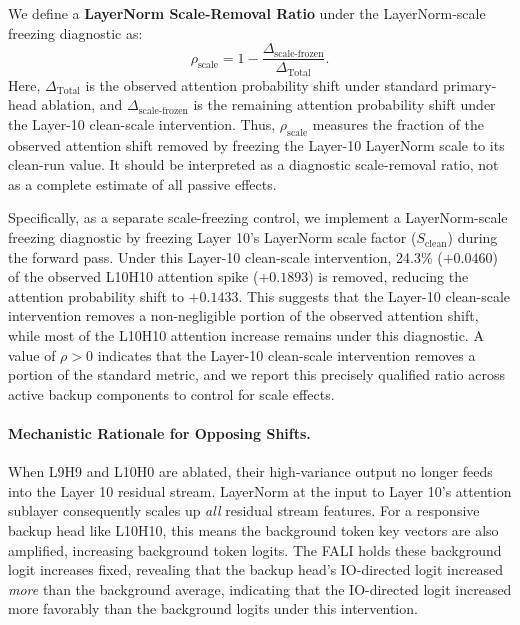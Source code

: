 \documentclass[12pt,a4paper]{article}
\begin{document}
We define a \textbf{LayerNorm Scale-Removal Ratio} under the LayerNorm-scale freezing diagnostic as:
\begin{equation}
  \rho_\text{scale}
  =
  1 - \frac{\Delta_\text{scale-frozen}}{\Delta_\text{Total}}.
  \label{eq:scale_removal_ratio}
\end{equation}
Here, $\Delta_\text{Total}$ is the observed attention probability shift under standard primary-head ablation, and $\Delta_\text{scale-frozen}$ is the remaining attention probability shift under the Layer-10 clean-scale intervention. Thus, $\rho_\text{scale}$ measures the fraction of the observed attention shift removed by freezing the Layer-10 LayerNorm scale to its clean-run value. It should be interpreted as a diagnostic scale-removal ratio, not as a complete estimate of all passive effects.

Specifically, as a separate scale-freezing control, we implement a LayerNorm-scale freezing diagnostic by freezing Layer 10's LayerNorm scale factor ($S_\text{clean}$) during the forward pass. Under this Layer-10 clean-scale intervention, 24.3\% ($+0.0460$) of the observed L10H10 attention spike ($+0.1893$) is removed, reducing the attention probability shift to $+0.1433$. This suggests that the Layer-10 clean-scale intervention removes a non-negligible portion of the observed attention shift, while most of the L10H10 attention increase remains under this diagnostic. A value of $\rho > 0$ indicates that the Layer-10 clean-scale intervention removes a portion of the standard metric, and we report this precisely qualified ratio across active backup components to control for scale effects.

\paragraph{Mechanistic Rationale for Opposing Shifts.} When L9H9 and L10H0 are
ablated, their high-variance output no longer feeds into the Layer 10 residual
stream. LayerNorm at the input to Layer 10's attention sublayer consequently
scales up \emph{all} residual stream features. For a responsive backup head like
L10H10, this means the background token key vectors are also amplified,
increasing background token logits. The FALI holds these background logit
increases fixed, revealing that the backup head's IO-directed logit increased
\emph{more} than the background average, indicating that the IO-directed logit increased more favorably than the background logits under this intervention.
\end{document}

